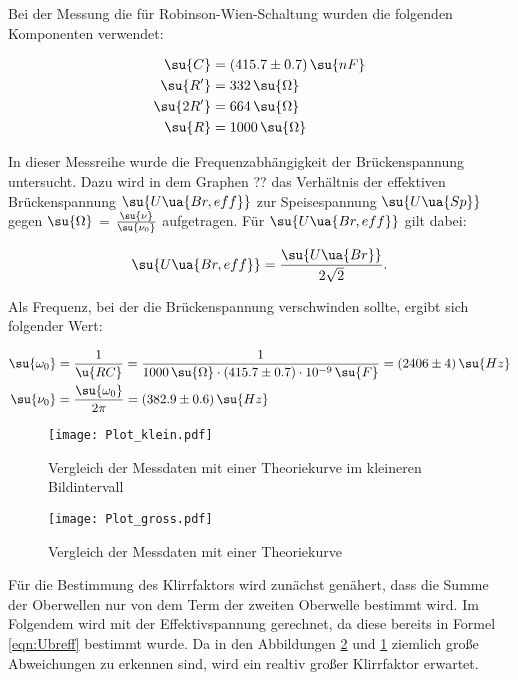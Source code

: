 Bei der Messung die für Robinson-Wien-Schaltung wurden die folgenden Komponenten
verwendet:

\begin{align}
  \su{C}   &=  (415.7 \pm 0.7) \, \su{nF}  \\
  \su{R'}  &= 332 \, \su{\Omega}          \\
  \su{2R'} &= 664 \, \su{\Omega}         \\
  \su{R}   &= 1000 \, \su{\Omega}
\end{align}

In dieser Messreihe wurde die Frequenzabhängigkeit der Brückenspannung untersucht.
Dazu wird in dem Graphen ?? das Verhältnis der effektiven Brückenspannung $\su{U\ua{Br,eff}}$
zur Speisespannung $\su{U\ua{Sp}}$ gegen $\su{\Omega}$ = $\frac{\su{\nu}}{\su{\nu_0}}$
aufgetragen. Für $\su{U\ua{Br,eff}}$ gilt dabei:

\begin{equation}
  \su{U\ua{Br,eff}} = \frac{\su{U\ua{Br}}}{2\sqrt{2}}.
  \label{eqn:Ubreff}
\end{equation}

Als Frequenz, bei der die Brückenspannung verschwinden sollte, ergibt sich folgender
Wert:

\begin{align}
  \su{\omega_0} &= \frac{1}{\u{RC}} = \frac{1}{1000 \, \su{\Omega} \cdot (415.7 \pm 0.7) \cdot 10^{-9} \, \su{F}} = (2406 \pm 4) \, \su{Hz} \\
  \su{\nu_0}    &= \frac{\su{\omega_0}}{2\pi} = (382.9 \pm 0.6) \, \su{Hz}
\end{align}

\begin{figure}
  \centering
  \texttt{[image: Plot\_klein.pdf]}
  \caption{Vergleich der Messdaten mit einer Theoriekurve im kleineren Bildintervall}
  \label{Plotgeschnitten}
\end{figure}

\begin{figure}
  \centering
  \texttt{[image: Plot\_gross.pdf]}
  \caption{Vergleich der Messdaten mit einer Theoriekurve}
  \label{Plotkomplett}
\end{figure}

Für die Bestimmung des Klirrfaktors wird zunächst genähert, dass die Summe der
Oberwellen nur von dem Term der zweiten Oberwelle bestimmt wird. Im Folgendem
wird mit der Effektivspannung gerechnet, da diese bereits in Formel \eqref{eqn:Ubreff}
bestimmt wurde. Da in den Abbildungen \ref{Plotkomplett} und \ref{Plotgeschnitten}
ziemlich große Abweichungen zu erkennen sind, wird ein realtiv großer Klirrfaktor
erwartet.

